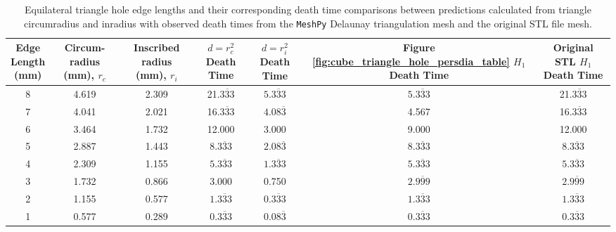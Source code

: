 \documentclass[ma]{uncgdissertationexp}
\theoremstyle{plain}
\theoremstyle{definition}
\theoremstyle{remark}
\begin{document}
\begin{table}[H]
\centering
\begin{tabular}{|c|c|c|c|c|c|c|}
    \hline
    \makecell{Edge\\Length\\(mm)} & \makecell{Circum-\\radius\\(mm), $r_{c}$} & \makecell{Inscribed\\ radius\\ (mm), $r_{i}$} & \makecell{$d=r_{c}^{2}$\\Death\\Time} & \makecell{$d=r_{i}^{2}$\\Death\\Time} & \makecell{Figure \ref{fig:cube_triangle_hole_persdia_table}\\$H_1$ Death\\ Time} & \makecell{Original STL\\$H_{1}$ Death\\Time}\\
    \hline
    8     & 4.619 & 2.309 & 21.$\overline{333}$ & $5.\overline{333}$ & $5.\overline{333}$ & 21.$\overline{333}$\\
    7     & 4.041 & 2.021 & 16.$\overline{333}$ & $4.08\overline{3}$ & 4.567 & 16.$\overline{333}$\\
    6     & 3.464 & 1.732 & 12.000 & 3.000 & 9.000 & 12.000\\
    5     & 2.887 & 1.443 & 8.$\overline{333}$ & $2.08\overline{3}$ & $8.\overline{333}$ & 8.$\overline{333}$\\
    4     & 2.309 & 1.155 & $5.\overline{333}$ & $1.\overline{333}$ & $5.\overline{333}$ & $5.\overline{333}$\\
    3     & 1.732 & 0.866 & 3.000 & 0.750 & $2.\overline{999}$ & $2.\overline{999}$\\
    2     & 1.155 & 0.577 & $1.\overline{333}$ & $0.\overline{333}$ & $1.\overline{333}$ & $1.\overline{333}$\\
    1     & 0.577 & 0.289 & $0.\overline{333}$ & $0.08\overline{3}$ & $0.\overline{333}$ & $0.\overline{333}$\\
    \hline
\end{tabular}
\cprotect\caption[Equilateral triangle hole edge lengths and death time comparisons.]{Equilateral triangle hole edge lengths and their corresponding death time comparisons between predictions calculated from triangle circumradius and inradius with observed death times from the \verb"MeshPy" Delaunay triangulation mesh and the original STL file mesh.}
\label{tab:eq_tri_hole_table}
\end{table}
\end{document}
